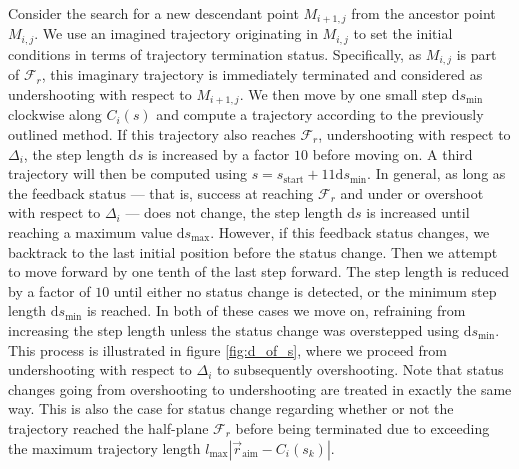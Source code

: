 Consider the search for a new descendant point $M_{i+1,j}$ from the ancestor point $M_{i,j}$. We use an imagined trajectory originating in $M_{i,j}$ to set the initial conditions in terms of trajectory termination status. Specifically, as $M_{i,j}$ is part of $\mathcal{F}_r$, this imaginary trajectory is immediately terminated and considered as undershooting with respect to $M_{i+1,j}$. We then move by one small step $\text{d}s_{\text{min}}$ clockwise along $C_i(s)$ and compute a trajectory according to the previously outlined method. If this trajectory also reaches $\mathcal{F}_r$, undershooting with respect to $\Delta_i$, the step length $\text{d}s$ is increased by a factor $10$ before moving on. A third trajectory will then be computed using $s=s_{\text{start}}+11\text{d}s_{\text{min}}$. In general, as long as the feedback status --- that is, success at reaching $\mathcal{F}_r$ and under or overshoot with respect to $\Delta_i$ --- does not change, the step length $\text{d}s$ is increased until reaching a maximum value $\text{d}s_{\text{max}}$. However, if this feedback status changes, we backtrack to the last initial position before the status change. Then we attempt to move forward by one tenth of the last step forward. The step length is reduced by a factor of $10$ until either no status change is detected, or the minimum step length $\text{d}s_{\text{min}}$ is reached. In both of these cases we move on,  refraining from increasing the step length unless the status change was overstepped using $\text{d}s_{\text{min}}$. This process is illustrated in figure \ref{fig:d_of_s}, where we proceed from undershooting with respect to $\Delta_i$ to subsequently overshooting. Note that status changes going from overshooting to undershooting are treated in exactly the same way. This is also the case for status change regarding whether or not the trajectory reached the half-plane $\mathcal{F}_r$ before being terminated due to exceeding the maximum trajectory length $l_{\text{max}}\left|\vec{r}_{\text{aim}}-C_i(s_k)\right|$.

